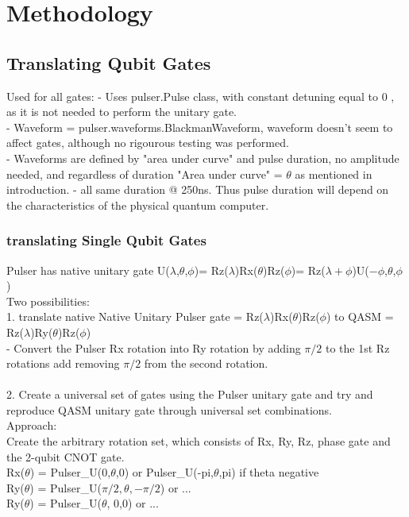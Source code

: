 \section{Methodology}
\label{sec:methods}

\subsection{Translating Qubit Gates}
\label{sec:Gates}
Used for all gates:
- Uses pulser.Pulse class, with constant detuning equal to 0 , as it is not needed to perform the unitary gate.\\
- Waveform = pulser.waveforms.BlackmanWaveform, waveform doesn't seem to affect gates, although no rigourous testing was performed.\\
- Waveforms are defined by "area under curve" and pulse duration, no amplitude needed, and regardless of duration "Area under curve" = $\theta$
 as mentioned in introduction.
- all same duration @ 250ns. Thus pulse duration will depend on the characteristics of the physical quantum computer.

\subsubsection{translating Single Qubit Gates}
\label{sec:SingleGatesTranslating}

Pulser has native unitary gate U($\lambda$,$\theta$,$\phi$)= Rz($\lambda$)Rx($\theta$)Rz($\phi$)= Rz($\lambda+\phi$)U($-\phi$,$\theta$,$\phi$)\\

Two possibilities:\\
1. translate native Native Unitary Pulser gate = Rz($\lambda$)Rx($\theta$)Rz($\phi$) to QASM = Rz($\lambda$)Ry($\theta$)Rz($\phi$)\\
    -   Convert the Pulser Rx rotation into Ry rotation by adding $\pi/2$ to the 1st Rz rotations add removing $\pi/2$ from the second rotation.\\\\

2. Create a universal set of gates using the Pulser unitary gate and try and reproduce QASM unitary gate through universal set combinations.\\
Approach:\\
    Create the arbitrary rotation set, which consists of Rx, Ry, Rz, phase gate and the 2-qubit CNOT gate.\\
    Rx($\theta$) = Pulser\_U(0,$\theta$,0) or Pulser\_U(-pi,$\theta$,pi) if theta negative\\
    Ry($\theta$) = Pulser\_U($\pi/2,\theta, -\pi/2$) or ... \\
    Ry($\theta$) = Pulser\_U($\theta$, 0,0) or ... \\
    
